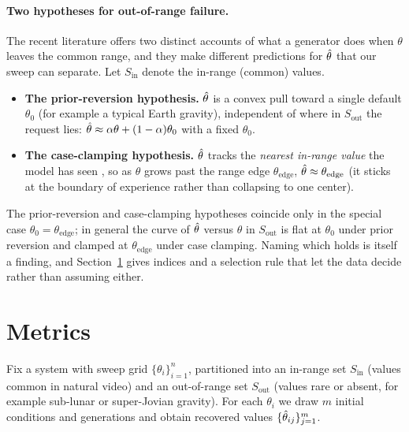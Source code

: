 \documentclass[10pt,twocolumn,letterpaper]{article}
\begin{document}
\paragraph{Two hypotheses for out-of-range failure.}
The recent literature offers two distinct accounts of what a generator does
when $\theta$ leaves the common range, and they make different predictions for
$\hat{\theta}$ that our sweep can separate. Let $S_\text{in}$ denote the in-range
(common) values.
\begin{itemize}[leftmargin=1.4em,itemsep=2pt,topsep=2pt]
  \item \textbf{The prior-reversion hypothesis.} $\hat{\theta}$ is a convex pull toward a
  single default $\theta_0$ (for example a typical Earth gravity), independent
  of where in $S_\text{out}$ the request lies:
  $\hat{\theta} \approx \alpha\theta + (1-\alpha)\theta_0$ with a fixed $\theta_0$.
  \item \textbf{The case-clamping hypothesis.} $\hat{\theta}$ tracks the \emph{nearest
  in-range value} the model has seen \citep{kang2025howfar}, so as $\theta$ grows
  past the range edge $\theta_{\text{edge}}$, $\hat{\theta} \approx \theta_{\text{edge}}$
  (it sticks at the boundary of experience rather than collapsing to one center).
\end{itemize}
The prior-reversion and case-clamping hypotheses coincide only in the special case $\theta_0=\theta_{\text{edge}}$;
in general the curve of $\hat{\theta}$ versus $\theta$ in $S_\text{out}$ is flat at
$\theta_0$ under prior reversion and clamped at $\theta_{\text{edge}}$ under case clamping. Naming which
holds is itself a finding, and Section~\ref{sec:metrics} gives indices and a
selection rule that let the data decide rather than assuming either.

\section{Metrics}
\label{sec:metrics}

Fix a system with sweep grid $\{\theta_i\}_{i=1}^{n}$, partitioned into an
in-range set $S_\text{in}$ (values common in natural video) and an
out-of-range set $S_\text{out}$ (values rare or absent, for example sub-lunar
or super-Jovian gravity). For each $\theta_i$ we draw $m$ initial conditions
and generations and obtain recovered values $\{\hat{\theta}_{ij}\}_{j=1}^{m}$.
\end{document}
